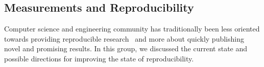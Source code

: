 \subsection{Measurements and Reproducibility}





Computer science and engineering community has traditionally been less
oriented towards providing reproducible
research~\cite{vbajpai:reproducibility:2017, qscheitle:reproducibility:2017}
and more about quickly publishing novel and promising results. In this group,
we discussed the current state and possible directions for improving the state
of reproducibility.

